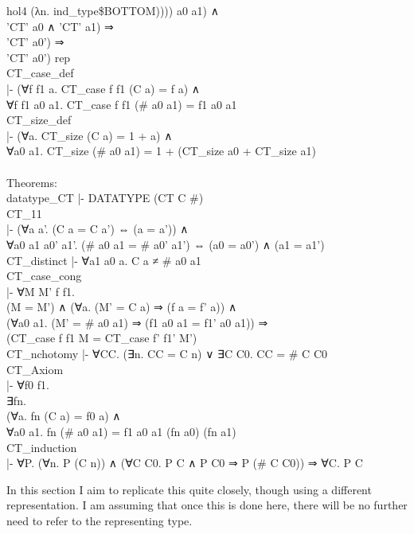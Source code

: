 \begin{GFT}{hol4}
\+                                  (λn. ind\_type\$BOTTOM)))) a0 a1) ∧\\
\+                      'CT' a0 ∧ 'CT' a1) ⇒\\
\+                   'CT' a0') ⇒\\
\+                'CT' a0') rep\\
\+    CT\_case\_def\\
\+    |- (∀f f1 a. CT\_case f f1 (C a) = f a) ∧\\
\+       ∀f f1 a0 a1. CT\_case f f1 (\# a0 a1) = f1 a0 a1\\
\+    CT\_size\_def\\
\+    |- (∀a. CT\_size (C a) = 1 + a) ∧\\
\+       ∀a0 a1. CT\_size (\# a0 a1) = 1 + (CT\_size a0 + CT\_size a1)\\
\+\\
\+Theorems:\\
\+    datatype\_CT  |- DATATYPE (CT C \#)\\
\+    CT\_11\\
\+    |- (∀a a'. (C a = C a') ⇔ (a = a')) ∧\\
\+       ∀a0 a1 a0' a1'. (\# a0 a1 = \# a0' a1') ⇔ (a0 = a0') ∧ (a1 = a1')\\
\+    CT\_distinct  |- ∀a1 a0 a. C a ≠ \# a0 a1\\
\+    CT\_case\_cong\\
\+    |- ∀M M' f f1.\\
\+         (M = M') ∧ (∀a. (M' = C a) ⇒ (f a = f' a)) ∧\\
\+         (∀a0 a1. (M' = \# a0 a1) ⇒ (f1 a0 a1 = f1' a0 a1)) ⇒\\
\+         (CT\_case f f1 M = CT\_case f' f1' M')\\
\+    CT\_nchotomy  |- ∀CC. (∃n. CC = C n) ∨ ∃C C0. CC = \# C C0\\
\+    CT\_Axiom\\
\+    |- ∀f0 f1.\\
\+         ∃fn.\\
\+           (∀a. fn (C a) = f0 a) ∧\\
\+           ∀a0 a1. fn (\# a0 a1) = f1 a0 a1 (fn a0) (fn a1)\\
\+    CT\_induction\\
\+    |- ∀P. (∀n. P (C n)) ∧ (∀C C0. P C ∧ P C0 ⇒ P (\# C C0)) ⇒ ∀C. P C\\
\end{GFT}

In this section I aim to replicate this quite closely, though using a different representation.
I am assuming that once this is done here, there will be no further need to refer to the representing type.

